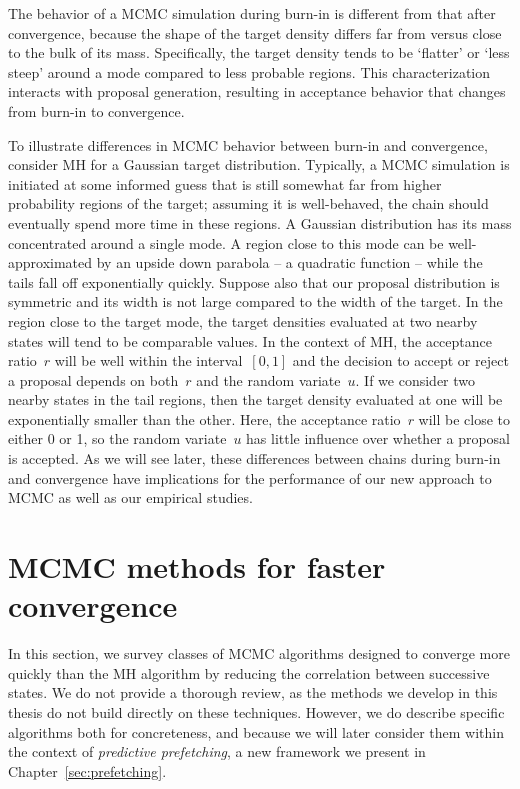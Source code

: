 \documentclass[angelino.tex]{subfiles}
\begin{document}
The behavior of a MCMC simulation during burn-in is different from that after
convergence, because the shape of the target density differs
far from versus close to the bulk of its mass.
Specifically, the target density tends to be `flatter' or `less steep'
around a mode compared to less probable regions.
This characterization interacts with proposal generation,
resulting in acceptance behavior that changes from burn-in to convergence.

To illustrate differences in MCMC behavior between burn-in and convergence, 
consider MH for a Gaussian target distribution.
Typically, a MCMC simulation is initiated at some informed guess that is still
somewhat far from higher probability regions of the target; assuming it is
well-behaved, the chain should eventually spend more time in these regions.
A Gaussian distribution has its mass concentrated around a single mode.
A region close to this mode can be well-approximated by an upside down parabola
-- a quadratic function -- while the tails fall off exponentially quickly.
Suppose also that our proposal distribution is symmetric and its width
is not large compared to the width of the target.
In the region close to the target mode, the target densities
evaluated at two nearby states will tend to be comparable values.
In the context of MH, the acceptance ratio~$r$ will be well within the
interval~$[0, 1]$ and the decision to accept or reject a proposal depends on
both~$r$ and the random variate~$u$.
If we consider two nearby states in the tail regions, then the target
density evaluated at one will be exponentially smaller than the other.
Here, the acceptance ratio~$r$ will be close to either 0 or 1, so the
random variate~$u$ has little influence over whether a proposal is accepted.
As we will see later, these differences between chains during burn-in and
convergence have implications for the performance of our new approach to
MCMC as well as our empirical studies.


\section{MCMC methods for faster convergence}

In this section, we survey classes of MCMC algorithms designed to
converge more quickly than the MH algorithm by reducing the 
correlation between successive states.
We do not provide a thorough review, as the methods we develop in this
thesis do not build directly on these techniques.
However, we do describe specific algorithms both for concreteness, and because
we will later consider them within the context of \emph{predictive prefetching},
a new framework we present in Chapter~\ref{sec:prefetching}.
\end{document}

